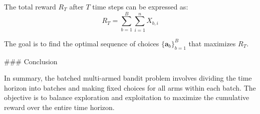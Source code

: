 The total reward \( R_T \) after \( T \) time steps can be expressed as:
\[ R_T = \sum_{b=1}^{B} \sum_{i=1}^{n} X_{b,i} \]

The goal is to find the optimal sequence of choices \( \{\mathbf{a}_b\}_{b=1}^B \) that maximizes \( R_T \).

### Conclusion

In summary, the batched multi-armed bandit problem involves dividing the time horizon into batches and making fixed choices for all arms within each batch. The objective is to balance exploration and exploitation to maximize the cumulative reward over the entire time horizon.